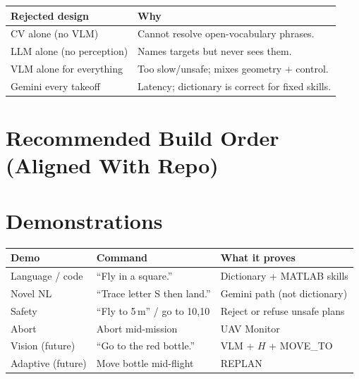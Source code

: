 \documentclass[11pt,a4paper]{article}
\begin{document}
\begin{center}
\small
\begin{tabular}{p{3.6cm}p{11.5cm}}
\toprule
\textbf{Rejected design} & \textbf{Why} \\
\midrule
CV alone (no VLM) & Cannot resolve open-vocabulary phrases. \\
LLM alone (no perception) & Names targets but never sees them. \\
VLM alone for everything & Too slow/unsafe; mixes geometry + control. \\
Gemini every takeoff & Latency; dictionary is correct for fixed skills. \\
\bottomrule
\end{tabular}
\end{center}

\section{Recommended Build Order (Aligned With Repo)}

\begin{center}
\end{center}

\section{Demonstrations}

\begin{center}
\small
\begin{tabular}{p{2.2cm}p{4cm}p{8.5cm}}
\toprule
\textbf{Demo} & \textbf{Command} & \textbf{What it proves} \\
\midrule
Language / code & ``Fly in a square.'' & Dictionary + MATLAB skills \\
Novel NL & ``Trace letter S then land.'' & Gemini path (not dictionary) \\
Safety & ``Fly to 5\,m'' / go to 10,10 & Reject or refuse unsafe plans \\
Abort & Abort mid-mission & UAV Monitor \\
Vision (future) & ``Go to the red bottle.'' & VLM + $H$ + MOVE\_TO \\
Adaptive (future) & Move bottle mid-flight & REPLAN \\
\bottomrule
\end{tabular}
\end{center}
\end{document}
